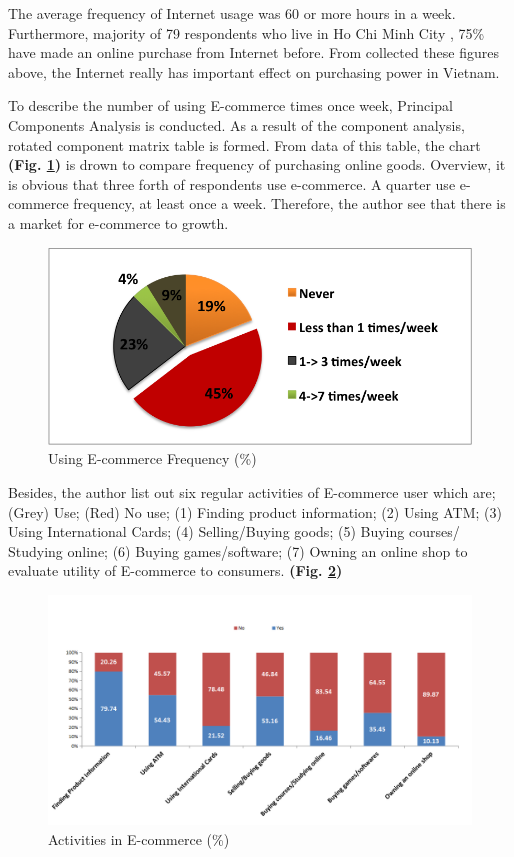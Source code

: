 \documentclass[conference]{IEEEtran}
\begin{document}
The average frequency of Internet usage was 60 or more hours in a week. Furthermore, majority of  79 respondents who live in Ho Chi Minh City , 75\% have made an online purchase from Internet before. From collected these figures above, the Internet really has important effect on purchasing power in Vietnam.

To describe the number of using E-commerce times once week, Principal Components Analysis is conducted. As a result of the component analysis, rotated component matrix table is formed. From data of this table, the chart \textbf{(Fig. \ref{fig:ecfreq})} is drown to compare frequency of purchasing online goods. Overview, it is obvious that three forth of respondents use e-commerce. A quarter use e-commerce frequency, at least once a week. Therefore, the author see that there is a market for e-commerce to growth.

\begin{figure}[h]
\centering
\includegraphics[width=0.7\linewidth]{./ecfreq}
\caption{Using E-commerce Frequency (\%)}
\label{fig:ecfreq}
\end{figure}


Besides, the author list out six regular activities of E-commerce user which are; (Grey) Use; (Red) No use; (1) Finding product information; (2) Using ATM; (3) Using International Cards; (4) Selling/Buying goods; (5) Buying courses/ Studying online; (6) Buying games/software; (7) Owning an online shop to evaluate utility of E-commerce to consumers. \textbf{(Fig. \ref{fig:ecactivities})}

\begin{figure}[tbph]
\centering
\includegraphics[width=0.7\linewidth]{./ecactivities}
\caption{Activities in E-commerce (\%)}
\label{fig:ecactivities}
\end{figure}
\end{document}
